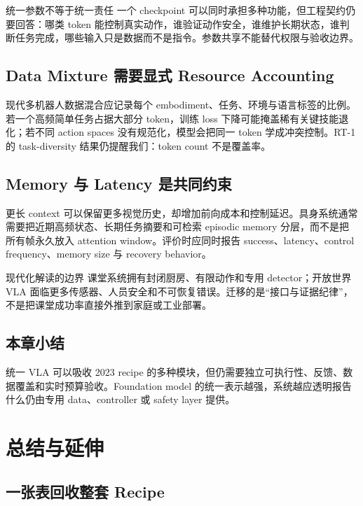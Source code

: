 \documentclass[a4paper]{article}
\begin{document}
\begin{importantbox}{统一参数不等于统一责任}
一个 checkpoint 可以同时承担多种功能，但工程契约仍要回答：哪类 token 能控制真实动作，谁验证动作安全，谁维护长期状态，谁判断任务完成，哪些输入只是数据而不是指令。参数共享不能替代权限与验收边界。
\end{importantbox}

\subsection{Data Mixture 需要显式 Resource Accounting}

现代多机器人数据混合应记录每个 embodiment、任务、环境与语言标签的比例。若一个高频简单任务占据大部分 token，训练 loss 下降可能掩盖稀有关键技能退化；若不同 action spaces 没有规范化，模型会把同一 token 学成冲突控制。RT-1 的 task-diversity 结果仍提醒我们：token count 不是覆盖率。

\subsection{Memory 与 Latency 是共同约束}

更长 context 可以保留更多视觉历史，却增加前向成本和控制延迟。具身系统通常需要把近期高频状态、长期任务摘要和可检索 episodic memory 分层，而不是把所有帧永久放入 attention window。评价时应同时报告 success、latency、control frequency、memory size 与 recovery behavior。

\begin{warningbox}{现代化解读的边界}
课堂系统拥有封闭厨房、有限动作和专用 detector；开放世界 VLA 面临更多传感器、人员安全和不可恢复错误。迁移的是“接口与证据纪律”，不是把课堂成功率直接外推到家庭或工业部署。
\end{warningbox}

\subsection{本章小结}

统一 VLA 可以吸收 2023 recipe 的多种模块，但仍需要独立可执行性、反馈、数据覆盖和实时预算验收。Foundation model 的统一表示越强，系统越应透明报告什么仍由专用 data、controller 或 safety layer 提供。

\section{总结与延伸}

\subsection{一张表回收整套 Recipe}
\end{document}
